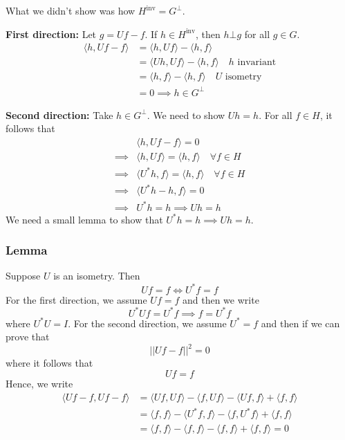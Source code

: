 \documentclass{article}
\begin{document}
What we didn't show was how $H^{\text{inv}}= G^\bot$.

\textbf{First direction:} Let $g=Uf-f$. If $h\in H^{\text{inv}}$, then $h\bot g$ for all $g\in G$.
\begin{align*}
    \langle h, Uf-f\rangle &= \langle h, Uf \rangle - \langle h, f\rangle \\
    &= \langle Uh, Uf \rangle - \langle h, f\rangle \quad h\text{ invariant} \\
    &= \langle h, f \rangle - \langle h, f\rangle \quad U\text{ isometry} \\
    &= 0 \implies h\in G^\bot
\end{align*}

\textbf{Second direction:} Take $h\in G^\bot$. We need to show $Uh=h$. For all $f\in H$, it follows that 
\begin{align*}
    &\langle h, Uf-f\rangle=0\\
    \implies& \langle h, Uf\rangle = \langle h, f \rangle \quad \forall f\in H\\
    \implies& \langle U^\ast h, f\rangle = \langle h, f \rangle \quad \forall f\in H\\
    \implies& \langle U^\ast h - h, f \rangle =0\\
    \implies& U^\ast h = h \implies Uh=h
\end{align*}
We need a small lemma to show that $U^\ast h = h \implies Uh=h$.

\subsubsection{Lemma}

Suppose $U$ is an isometry. Then 
\[
Uf =f \iff U^\ast f = f
\]
For the first direction, we assume $Uf = f$ and then we write 
\[
U^\ast Uf = U^\ast f \implies f = U^\ast f
\]
where $U^\ast U=I$. For the second direction, we assume $U^\ast = f$ and then if we can prove that 
\[
\left|\left| Uf-f \right|\right|^2 = 0
\]
where it follows that 
\[
Uf=f
\]
Hence, we write 
\begin{align*}
    \langle Uf-f, Uf-f \rangle &= \langle Uf, Uf \rangle - \langle f, Uf \rangle -\langle Uf, f \rangle + \langle f, f \rangle\\
    &= \langle f, f \rangle - \langle U^\ast f, f \rangle - \langle f, U^\ast f \rangle + \langle f, f \rangle\\
    &= \langle f, f \rangle - \langle f, f \rangle - \langle f, f \rangle + \langle f, f \rangle=0
\end{align*}
\end{document}
